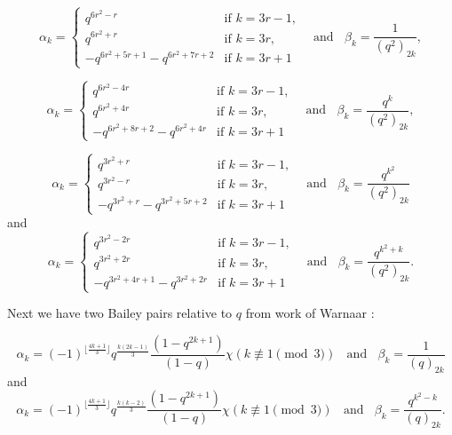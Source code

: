 \documentclass[11pt,reqno]{amsart}
\theoremstyle{definition}
\numberwithin{equation}{section}
\renewcommand{\=}{\;=\;}
\begin{document}
\begin{equation} \label{BP1}
	\alpha_k = 
	\begin{cases}
		q^{6r^2 -r} & \text{if $k=3r-1$}, \\
		q^{6r^2 +r} & \text{if $k=3r$}, \\
		-q^{6r^2+5r+1} - q^{6r^2+7r+2} &\text{if $k=3r+1$}
	\end{cases}
	\ \ \ \ \text{and} \ \ \ \ \beta_k = \frac{1}{(q^2)_{2k}},
\end{equation} 

\begin{equation} \label{BP2}
	\alpha_k = 
	\begin{cases}
		q^{6r^2 -4r} & \text{if $k=3r-1$}, \\
		q^{6r^2 +4r} & \text{if $k=3r$}, \\
		-q^{6r^2+8r+2} - q^{6r^2+4r} &\text{if $k=3r+1$}
	\end{cases}
\ \ \ \ \text{and} \ \ \ \ \beta_k = \frac{q^k}{(q^2)_{2k}},
\end{equation}  

\begin{equation} \label{BP3}
	\alpha_k = 
	\begin{cases}
		q^{3r^2+r} & \text{if $k=3r-1$}, \\
		q^{3r^2-r} & \text{if $k=3r$}, \\
		-q^{3r^2+r} - q^{3r^2+5r+2} &\text{if $k=3r+1$}
	\end{cases}
\ \ \ \ \text{and} \ \ \ \ \beta_k = \frac{q^{k^2}}{(q^2)_{2k}}
\end{equation}
and
\begin{equation} \label{BP4}
	\alpha_k = 
	\begin{cases}
		q^{3r^2 -2r} & \text{if $k=3r-1$}, \\
		q^{3r^2 +2r} & \text{if $k=3r$}, \\
		-q^{3r^2+4r+1} - q^{3r^2+2r} &\text{if $k=3r+1$}
	\end{cases}
\ \ \ \ \text{and} \ \ \ \ \beta_k = \frac{q^{k^2+k}}{(q^2)_{2k}}.
\end{equation}

Next we have two Bailey pairs relative to $q$ from work of Warnaar \cite{Wa}:

\begin{equation} \label{BP5}
	\alpha_k = (-1)^{\lfloor \frac{4k+1}{3} \rfloor}q^{\frac{k(2k-1)}{3}}\frac{(1-q^{2k+1})}{(1-q)}\chi(k \not \equiv 1 \pmod{3})
\ \ \ \ \text{and} \ \ \ \	\beta_k = \frac{1}{(q)_{2k}}
\end{equation}
and
\begin{equation} \label{BP6}
	\alpha_k = (-1)^{\lfloor \frac{4k+1}{3} \rfloor}q^{\frac{k(k-2)}{3}}\frac{(1-q^{2k+1})}{(1-q)}\chi(k \not \equiv 1 \pmod{3}) \ \ \ \ \text{and} \ \ \ \ 
	\beta_k = \frac{q^{k^2-k}}{(q)_{2k}}.
\end{equation}
\end{document}
